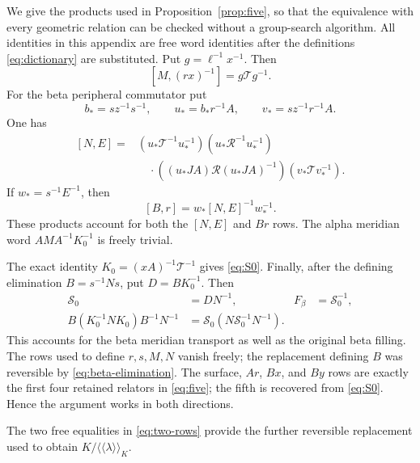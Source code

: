 \documentclass[11pt]{amsart}
\theoremstyle{definition}
\theoremstyle{remark}
\newcommand{\nc}[1]{\langle\!\langle #1\rangle\!\rangle}
\begin{document}
We give the products used in Proposition~\ref{prop:five}, so that
the equivalence with every geometric relation can be checked without
a group-search algorithm. All identities in this appendix are free
word identities after the definitions \eqref{eq:dictionary} are
substituted. Put $g=\ell^{-1}x^{-1}$. Then
\begin{equation}\label{eq:MC-product}
                  [M,(rx)^{-1}]=g\mathcal T g^{-1}.
\end{equation}
For the beta peripheral commutator put
\[
 b_*=sz^{-1}s^{-1},\qquad
 u_*=b_*r^{-1}A,\qquad v_*=sz^{-1}r^{-1}A.
\]
One has
\begin{equation}\label{eq:NE-product}
\begin{split}
 [N,E]={}&(u_*\mathcal T^{-1}u_*^{-1})
           (u_*\mathcal R^{-1}u_*^{-1})\\
 &\quad\cdot((u_*JA)\mathcal R(u_*JA)^{-1})
           (v_*\mathcal T v_*^{-1}).
\end{split}
\end{equation}
If $w_*=s^{-1}E^{-1}$, then
\begin{equation}\label{eq:Br-product}
                      [B,r]=w_*[N,E]^{-1}w_*^{-1}.
\end{equation}
These products account for both the $[N,E]$ and $Br$ rows.
The alpha meridian word $AMA^{-1}K_0^{-1}$ is freely trivial.

The exact identity $K_0=(xA)^{-1}\mathcal T^{-1}$ gives
\eqref{eq:S0}. Finally, after the defining elimination $B=s^{-1}Ns$,
put $D=BK_0^{-1}$. Then
\begin{equation}\label{eq:beta-meridian-product}
\begin{aligned}
 \mathcal S_0&=DN^{-1},&F_\beta&=\mathcal S_0^{-1},\\
 B(K_0^{-1}NK_0)B^{-1}N^{-1}
      &=\mathcal S_0(N\mathcal S_0^{-1}N^{-1}).
\end{aligned}
\end{equation}
This accounts for the beta meridian transport as well as the
original beta filling. The rows used to define $r,s,M,N$ vanish
freely; the replacement defining $B$ was reversible by
\eqref{eq:beta-elimination}. The surface, $Ar$, $Bx$, and $By$
rows are exactly the first four retained relators in
\eqref{eq:five}; the fifth is recovered from
\eqref{eq:S0}. Hence the argument works in both directions.

The two free equalities in \eqref{eq:two-rows} provide the further
reversible replacement used to obtain $K/\nc{\lambda}_K$.
\end{document}
